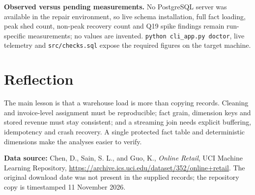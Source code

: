 \documentclass[10pt,a4paper]{article}
\begin{document}
\textbf{Observed versus pending measurements.} No PostgreSQL server was available in the repair environment, so live schema installation, full fact loading, peak shed count, non-peak recovery count and Q19 spike findings remain run-specific measurements; no values are invented. \texttt{python cli\_app.py doctor}, live telemetry and \texttt{src/checks.sql} expose the required figures on the target machine.

\section{Reflection}
The main lesson is that a warehouse load is more than copying records. Cleaning and invoice-level assignment must be reproducible; fact grain, dimension keys and stored revenue must stay consistent; and a streaming join needs explicit buffering, idempotency and crash recovery. A single protected fact table and deterministic dimensions make the analyses easier to verify.

\vfill
\footnotesize
\textbf{Data source:} Chen, D., Sain, S. L., and Guo, K., \emph{Online Retail}, UCI Machine Learning Repository, \url{https://archive.ics.uci.edu/dataset/352/online+retail}. The original download date was not present in the supplied records; the repository copy is timestamped 11 November 2026.
\end{document}
